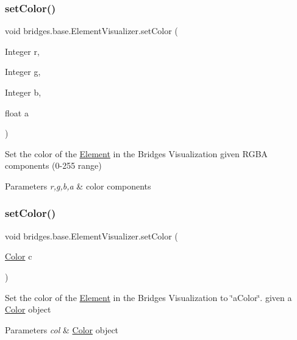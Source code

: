 \subsubsection{\texorpdfstring{set\+Color()}{setColor()}\hspace{0.1cm}{\footnotesize\ttfamily [2/3]}}
{\footnotesize\ttfamily void bridges.\+base.\+Element\+Visualizer.\+set\+Color (\begin{DoxyParamCaption}\item[{Integer}]{r,  }\item[{Integer}]{g,  }\item[{Integer}]{b,  }\item[{float}]{a }\end{DoxyParamCaption})}

Set the color of the \mbox{\hyperlink{classbridges_1_1base_1_1_element}{Element}} in the Bridges Visualization given R\+G\+BA components (0-\/255 range)


\begin{DoxyParams}{Parameters}
{\em r,g,b,a} & color components \\
\hline
\end{DoxyParams}
\mbox{\label{classbridges_1_1base_1_1_element_visualizer_a33172ab908f3b6f9740727b0bfe91565}} 
\subsubsection{\texorpdfstring{set\+Color()}{setColor()}\hspace{0.1cm}{\footnotesize\ttfamily [3/3]}}
{\footnotesize\ttfamily void bridges.\+base.\+Element\+Visualizer.\+set\+Color (\begin{DoxyParamCaption}\item[{\mbox{\hyperlink{classbridges_1_1base_1_1_color}{Color}}}]{c }\end{DoxyParamCaption})}

Set the color of the \mbox{\hyperlink{classbridges_1_1base_1_1_element}{Element}} in the Bridges Visualization to \char`\"{}a\+Color\char`\"{}. given a \mbox{\hyperlink{classbridges_1_1base_1_1_color}{Color}} object


\begin{DoxyParams}{Parameters}
{\em col} & \mbox{\hyperlink{classbridges_1_1base_1_1_color}{Color}} object \\
\hline
\end{DoxyParams}
\mbox{\label{classbridges_1_1base_1_1_element_visualizer_a04f3416447f2042de7cd21ce5b6a0598}} 
